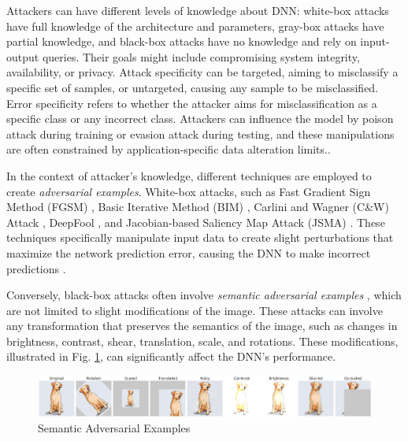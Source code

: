 Attackers can have different levels of knowledge about DNN: white-box attacks have full knowledge of the architecture and parameters, gray-box attacks have partial knowledge, and black-box attacks have no knowledge and rely  on input-output queries. Their goals might include compromising system integrity, availability, or privacy. Attack specificity can be targeted, aiming to misclassify a specific set of samples, or untargeted, causing any sample to be misclassified. 
Error specificity refers to whether the attacker aims for misclassification as a specific class or any incorrect class. Attackers can influence the model by poison attack \cite{poisonattack,Badnets} during training or evasion attack \cite{evasion} during testing, and these manipulations are often constrained by application-specific data alteration limits.\cite{Chakraborty}.

In the context of attacker's knowledge, different techniques are employed to create \emph{adversarial examples}. White-box attacks, such as Fast Gradient Sign Method (FGSM) \cite{FGSM}, Basic Iterative Method (BIM) \cite{BIM}, Carlini and Wagner (C\&W) Attack \cite{Carlini}, DeepFool \cite{deepfool}, and Jacobian-based Saliency Map Attack (JSMA) \cite{JSMA}. These techniques specifically manipulate input data to create slight perturbations that maximize the network prediction error, causing the DNN to make incorrect predictions \cite{Hosseini}.

Conversely, black-box attacks often involve \emph{semantic adversarial examples} \cite{HuangX,deeptest,Engstrom,Pei}, which are not limited to slight modifications of the image. These attacks can involve any transformation that preserves the semantics of the image, such as changes in brightness, contrast, shear, translation, scale, and rotations. These modifications, illustrated in Fig. \ref{fig:image-trans}, can significantly affect the DNN's performance. 



\begin{center}
  \end{center}

  \begin{figure}
    \centering
    \includegraphics[width=\linewidth]{figures/output_update.png}
    \caption{Semantic Adversarial Examples}
    \label{fig:image-trans}
  \end{figure}


